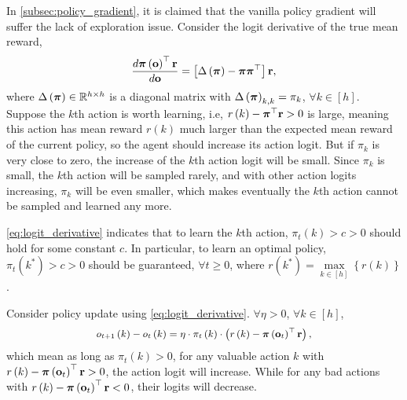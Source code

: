 In \cref{subsec:policy_gradient}, it is claimed that the vanilla policy gradient will suffer the lack of exploration issue. Consider the logit derivative of the true mean reward,
\begin{equation}
\label{eq:logit_derivative}
\begin{split}
    \frac{d {\boldsymbol{\pi}}\left( {\mathbf{o}} \right)^\top {\mathbf{r}}}{d {\mathbf{o}}} = \left[ \Delta\left( {\boldsymbol{\pi}} \right) - {\boldsymbol{\pi}} {\boldsymbol{\pi}}^\top \right] {\mathbf{r}},
\end{split}
\end{equation}
where $\Delta\left( {\boldsymbol{\pi}} \right) \in {\mathbb{R}}^{h \times h}$ is a diagonal matrix with $\Delta\left( {\boldsymbol{\pi}} \right)_{k,k} = \pi_{k}$, $\forall k \in [h]$. Suppose the $k$th action is worth learning, i.e, $r\left(k\right) - {\boldsymbol{\pi}}^\top {\mathbf{r}} > 0$ is large, meaning this action has mean reward $r\left(k\right)$ much larger than the expected mean reward of the current policy, so the agent should increase its action logit. But if $\pi_{k}$ is very close to zero, the increase of the $k$th action logit will be small. Since $\pi_{k}$ is small, the $k$th action will be sampled rarely, and with other action logits increasing, $\pi_{k}$ will be even smaller, which makes eventually the $k$th action cannot be sampled and learned any more.

\cref{eq:logit_derivative} indicates that to learn the $k$th action, $\pi_{t}\left(k\right) > c > 0$ should hold for some constant $c$. In particular, to learn an optimal policy, $\pi_{t}\left(k^*\right) > c > 0$ should be guaranteed, $\forall t \ge 0$, where $r\left(k^*\right) = \max\limits_{k \in \left[ h \right]}\left\{ r\left(k\right) \right\}$.

Consider policy update using \cref{eq:logit_derivative}. $\forall \eta > 0$, $\forall k \in [h]$,
\begin{equation*}
\label{eq:logit_increment_logit_space}
\begin{split}
\small
    o_{t+1}\left(k\right) - o_{t}\left(k\right) = \eta \cdot \pi_{t}\left(k\right) \cdot \left( r\left(k\right) - \rvpi\left( \rvo_{t} \right)^\top \rvr \right),
\end{split}
\end{equation*}
which mean as long as $\pi_{t}\left(k\right) > 0$, for any valuable action $k$ with $r\left(k\right) -  {\boldsymbol{\pi}}\left( {\mathbf{o}}_{t} \right)^\top {\mathbf{r}} > 0$, the action logit will increase. While for any bad actions with $r\left(k\right) -  {\boldsymbol{\pi}}\left( {\mathbf{o}}_{t} \right)^\top {\mathbf{r}} < 0$, their logits will decrease.

